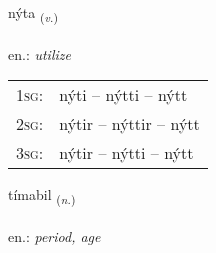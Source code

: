 \documentclass[frontgrid, backgrid]{flacards}\usepackage[]{graphicx}\usepackage[]{xcolor}
\begin{document}
\renewcommand{\flhead}{\vskip5pt \fboxsep=0pt {\small\bfseries\footnotesize Sagnorð | Verb}}
\renewcommand{\fcfoot}{\vskip5pt \fboxsep=0pt \hspace{2pt}{\small\bfseries\footnotesize 1K}}

\renewcommand{\blhead}{\vskip5pt {\small\bfseries\footnotesize Sagnorð | Verb }}
\renewcommand{\bcfoot}{\vskip5pt \hspace{2pt}{\small\bfseries\footnotesize 1K}}


{nýta \small{\textsubscript{(\textit{v.})}} \\[1ex] %
\textphonetic{[niːta]} \\
en.: \emph{utilize} \\  [2ex]
\renewcommand*{\arraystretch}{0.8}
\begin{tabular}{p{1cm}l}
\textsc{1sg}: & nýti -- nýtti -- nýtt \\ 
\textsc{2sg}: & nýtir -- nýttir -- nýtt \\ 
\textsc{3sg}: & nýtir -- nýtti -- nýtt \\ 
\end{tabular}
}

\renewcommand{\flhead}{\vskip5pt \fboxsep=0pt {\small\bfseries\footnotesize Nafnorð | Noun}}
\renewcommand{\fcfoot}{\vskip5pt \fboxsep=0pt \hspace{2pt}{\small\bfseries\footnotesize 1K}}

\renewcommand{\blhead}{\vskip5pt {\small\bfseries\footnotesize Nafnorð | Noun }}
\renewcommand{\bcfoot}{\vskip5pt \hspace{2pt}{\small\bfseries\footnotesize 1K}}


{tímabil \small{\textsubscript{(\textit{n.})}} \\[1ex] %
\textphonetic{[tʰiːmapɪl]} \\
en.: \emph{period, age} \\  [2ex]
\renewcommand*{\arraystretch}{0.8}
}
\end{document}
